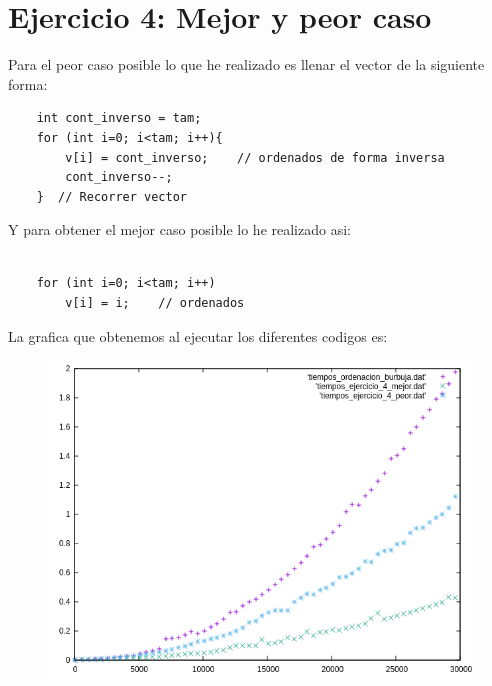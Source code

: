 \documentclass[12pt,a4psprt]{article}
\begin{document}
\section{Ejercicio 4: Mejor y peor caso}
Para el peor caso posible lo que he realizado es llenar el vector de la siguiente forma:
\begin{lstlisting}
	int cont_inverso = tam;
	for (int i=0; i<tam; i++){
		v[i] = cont_inverso;    // ordenados de forma inversa
		cont_inverso--;
	}  // Recorrer vector

\end{lstlisting}
Y para obtener el mejor caso posible lo he realizado asi:
\begin{lstlisting}

	for (int i=0; i<tam; i++)
		v[i] = i;    // ordenados
\end{lstlisting}
La grafica que obtenemos al ejecutar los diferentes codigos es:
\begin{figure}[h]
\begin{center}
	\includegraphics[scale=1]{image/grafica_4.png}
\end{center}
\end{figure}
\end{document}
